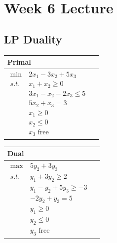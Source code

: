 \documentclass[11pt]{article}
\numberwithin{equation}{section}
\begin{document}
\newpage
\section{Week 6 Lecture}
\subsection{LP Duality}
\begin{example}
    \begin{minipage}[t]{.5\linewidth}
        \vspace{0pt}
        \centering
        \begin{tabular}{ll}
            Primal \\ \hline
            \parbox{5cm}{\begin{align*}
                \min \ & 2 x_{1}-3 x_{2}+5 x_{3} \\
                s.t.\ & x_{1}+x_{2} \geq 0 \\
                \ & 3 x_{1}-x_2-2 x_3 \leq 5 \\
                \ & 5 x_{2}+x_{3}=3 \\
                \ & x_1 \geq 0 \\
                \ & x_2 \leq 0 \\
                \ &x_3 \text{ free}
            \end{align*}}
        \end{tabular}
    \end{minipage}%
    \begin{minipage}[t]{.5\linewidth}
        \vspace{0pt}
        \centering
        \begin{tabular}{ll}
            Dual \\ \hline
            \parbox{5cm}{\begin{align*}
                \max \ & 5y_2 + 3y_3 \\
                s.t. \ &y_1 + 3y_2 \geq 2 \\
                &y_{1}-y_{2}+5 y_{3} \geq-3 \\
                &-2 y_{2}+y_{3}=5 \\
                & y_1 \geq 0 \\
                & y_2 \leq 0 \\
                & y_3 \text{ free}
            \end{align*}}
        \end{tabular}
    \end{minipage} 
\end{example}
\end{document}
